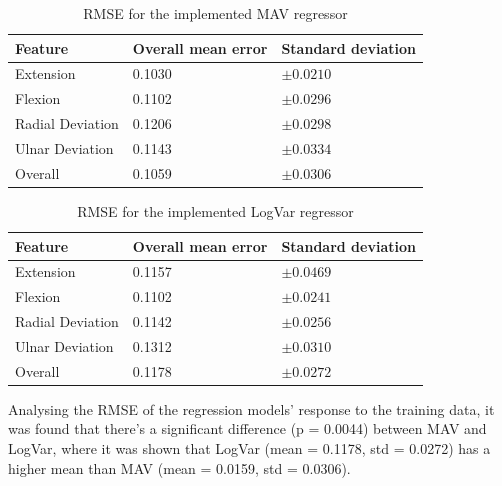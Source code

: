 \documentclass[a4paper, 10pt, conference]{ieeeconf}      %
\begin{document}
\begin{multicol}{2}
	\begin{table}[H]
		\begin{center}
			\begin{tabular}{l l l}
				\hline
				\textbf{Feature} & \textbf{Overall mean error} & \textbf{Standard deviation}\\
				\hline
				Extension & 0.1030 & $\pm 0.0210$ \\
				Flexion & 0.1102 & $\pm 0.0296$ \\
				Radial Deviation & 0.1206 & $\pm 0.0298$ \\
				Ulnar Deviation & 0.1143 & $\pm 0.0334$ \\
				Overall & 0.1059 & $\pm 0.0306$ \\
				\hline
			\end{tabular}
			\caption{RMSE for the implemented MAV regressor}
		\end{center}
	\end{table}
	
	\begin{table}[H]
		\begin{center}
			\begin{tabular}{l l l}
				\hline
				\textbf{Feature} & \textbf{Overall mean error} & \textbf{Standard deviation}\\
				\hline
				Extension & 0.1157 & $\pm 0.0469$ \\
				Flexion & 0.1102 & $\pm 0.0241$ \\
				Radial Deviation & 0.1142 & $\pm 0.0256$ \\
				Ulnar Deviation & 0.1312 & $\pm 0.0310$ \\
				Overall & 0.1178 & $\pm 0.0272$ \\
				\hline
			\end{tabular}
			\caption{RMSE for the implemented LogVar regressor}
		\end{center}
	\end{table}
	
	Analysing the RMSE of the regression models' response to the training data, it was found that there's a significant difference (p = 0.0044) between MAV and LogVar, where it was shown that LogVar (mean = 0.1178, std = 0.0272) has a higher mean than MAV (mean = 0.0159, std = 0.0306).
	

\end{multicol}
\end{document}
